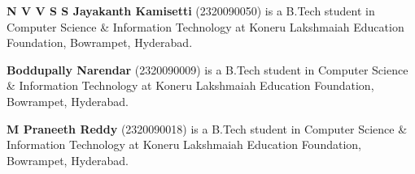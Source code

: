 \textbf{N V V S S Jayakanth Kamisetti} (2320090050) is a B.Tech student in Computer Science \& Information Technology at Koneru Lakshmaiah Education Foundation, Bowrampet, Hyderabad.

\textbf{Boddupally Narendar} (2320090009) is a B.Tech student in Computer Science \& Information Technology at Koneru Lakshmaiah Education Foundation, Bowrampet, Hyderabad.

\textbf{M Praneeth Reddy} (2320090018) is a B.Tech student in Computer Science \& Information Technology at Koneru Lakshmaiah Education Foundation, Bowrampet, Hyderabad.
